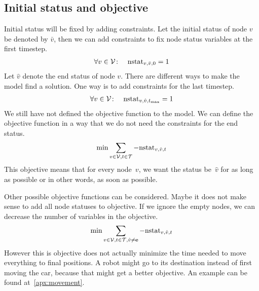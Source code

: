 \subsection{Initial status and objective}
\newcommand{\initW}[1]{\bar{#1}}
\newcommand{\termW}[1]{\hat{#1}}
Initial status will be fixed by adding constraints. Let the initial status of
node $v$ be denoted by $\initW{v}$, then we can add constraints to fix node
status variables at the first timestep.
\begin{align}
    &\forall v \in \V\colon &\nstat_{v,\initW{v},0} = 1
\end{align}
Let $\termW{v}$ denote the end status of node $v$. There are different ways to make
the model find a solution. One way is to add constraints for the last timestep.
\begin{align}
    &\forall v \in \V\colon &\nstat_{v,\termW{v},t_{\max}} = 1
\end{align}
We still have not defined the objective function to the model. We can
define the objective function in a way that we do not need the constraints for
the end status.
\begin{align}
    \min \sum_{v \in \V,t \in \T} -\nstat_{v,\termW{v},t}
\end{align}
This objective means that for every node~$v$, we want the status be~$\termW{v}$
for as long as possible or in other words, as soon as possible.

Other possible objective functions can be considered. Maybe it does not make
sense to add all node statuses to objective. If we ignore the empty nodes, we
can decrease the number of variables in the objective.
\begin{align}
    \label{eq:timeobj}
    \min \sum_{v \in \V,t \in \T,\termW{v} \neq \stat{e}}
    -\nstat_{v,\termW{v},t}
\end{align}
However this is objective does not actually minimize the time needed to move
everything to final positions. A robot might go to its destination instead of
first moving the car, because that might get a better objective. An example can
be found at~\autoref{apx:movement}.

